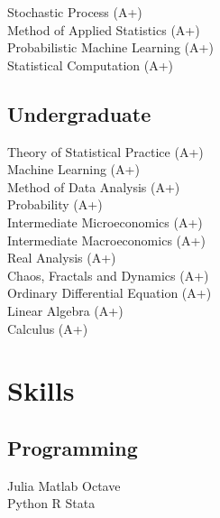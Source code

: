 \documentclass[letterpaper]{deedy-resume} %
\begin{document}
\begin{minipage}[t]{0.33\textwidth}
\sectionspace

Stochastic Process (A+)\\%
Method of Applied Statistics (A+) \\
Probabilistic Machine Learning (A+)\\%
Statistical Computation (A+) \\

\sectionspace %


\subsection{Undergraduate}
Theory of Statistical Practice (A+)\\%
Machine Learning (A+) \\
Method of Data Analysis (A+) \\
Probability (A+) \\
Intermediate Microeconomics (A+) \\
Intermediate Macroeconomics (A+) \\
Real Analysis (A+)\\%
Chaos, Fractals and Dynamics (A+) \\
Ordinary Differential Equation (A+) \\
Linear Algebra (A+)\\
Calculus (A+)\\

\sectionspace %


\section{Skills}
\subsection{Programming}
Julia \textbullet{} Matlab \textbullet{} Octave \\
Python \textbullet{} R \textbullet{} Stata \\


\end{minipage}
\end{document}
